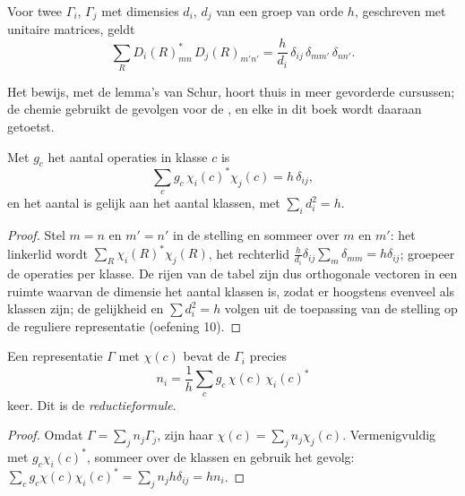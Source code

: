 \begin{theorem}\label{thm:b3:group-theory-applied:great-orthogonality}
Voor twee  $\Gamma_i$, $\Gamma_j$ met dimensies $d_i$,
$d_j$ van een groep van orde $h$, geschreven met unitaire matrices, geldt
\[
\sum_R D_i(R)_{mn}^*\,D_j(R)_{m'n'} = \frac{h}{d_i}\,\delta_{ij}\,\delta_{mm'}\,\delta_{nn'}.
\]
\end{theorem}
\admitted

Het bewijs, met de lemma's van Schur, hoort thuis in meer gevorderde
cursussen; de chemie gebruikt de gevolgen voor de , en elke
 in dit boek wordt daaraan getoetst.

\begin{corollary}\label{cor:b3:group-theory-applied:characters}
Met $g_c$ het aantal operaties in klasse $c$ is
\[
\sum_cg_c\,\chi_i(c)^*\chi_j(c) = h\,\delta_{ij},
\]
en het aantal  is gelijk aan het aantal
klassen, met $\sum_id_i^2 = h$.
\end{corollary}

\begin{proof}
Stel $m = n$ en $m' = n'$ in de stelling en sommeer over $m$ en $m'$: het
linkerlid wordt $\sum_R\chi_i(R)^*\chi_j(R)$, het rechterlid $\frac{h}{d_i}\delta_{ij}
\sum_{m}\delta_{mm} = h\delta_{ij}$; groepeer de operaties per klasse. De
rijen van de tabel zijn dus orthogonale vectoren in een ruimte waarvan de
dimensie het aantal klassen is, zodat er hoogstens evenveel  als klassen zijn; de gelijkheid en $\sum d_i^2 = h$ volgen
uit de toepassing van de stelling op de reguliere representatie
(oefening 10).
\end{proof}

\begin{theorem}[De reductieformule]\label{thm:b3:group-theory-applied:reduction}
Een representatie $\Gamma$ met  $\chi(c)$ bevat de  $\Gamma_i$ precies
\[
n_i = \frac1h\sum_cg_c\,\chi(c)\,\chi_i(c)^*
\]
keer. Dit is de \emph{reductieformule}.
\end{theorem}

\begin{proof}
Omdat $\Gamma = \sum_jn_j\Gamma_j$, zijn haar  $\chi(c) = \sum_jn_j\chi_j(c)$.
Vermenigvuldig met $g_c\chi_i(c)^*$, sommeer over de klassen en gebruik het
gevolg:
$\sum_cg_c\chi(c)\chi_i(c)^* = \sum_jn_jh\delta_{ij} = hn_i$.
\end{proof}

